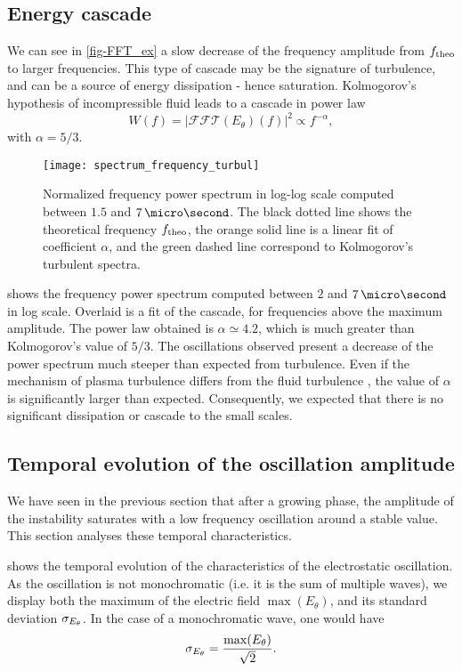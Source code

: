   \subsection{Energy cascade} \label{subsec-turbul}
  
  We can see in \cref{fig-FFT_ex} a slow decrease of the frequency amplitude from $f_{\rm theo}$ to larger frequencies.
  This type of cascade may be the signature of turbulence, and can be a source of energy dissipation - hence saturation.
  Kolmogorov's hypothesis of incompressible fluid leads to a cascade in power law \[ W(f) = | \mathcal{FFT}(E_{\theta})(f) |^2 \propto f ^ {- \alpha}, \]
  with $\alpha = 5/3$.
  \begin{figure}[!hbt]
    \centering
    \texttt{[image: spectrum\_frequency\_turbul]}
    \caption{Normalized frequency power spectrum in log-log scale computed between $1.5$ and $7\,\micro\second$. The black dotted line shows the  theoretical frequency $f_{\rm theo}$, the orange solid line is a linear fit of coefficient $\alpha$, and the green dashed line correspond to Kolmogorov's turbulent spectra. }
    \label{fig-turbul}
  \end{figure}
  
   shows the frequency power spectrum computed between $2$ and $7\,\micro\second$ in log scale.
  Overlaid is a fit of the cascade, for frequencies above the maximum amplitude.
  The power law obtained is $\alpha \simeq 4.2$, which is much greater than Kolmogorov's value of $5/3$.
  The oscillations observed present a decrease of the power spectrum much steeper than expected from turbulence.
  Even if the mechanism of plasma turbulence differs from the fluid turbulence \citep{tsytovich1972}, the value of $\alpha$ is significantly larger than expected.
  Consequently, we expected that there is no significant dissipation or cascade to the small scales.
  
  \subsection{Temporal evolution of the oscillation amplitude} \label{subsec-temp}
  We have seen in the previous section that after a growing phase, the amplitude of the instability saturates with a low frequency oscillation around a stable value.
  This section analyses these temporal characteristics.
  
   shows the temporal evolution of the characteristics of the electrostatic oscillation.
  As the oscillation is not monochromatic (i.e. it is the sum of multiple waves), we display both the maximum of the electric field $\max(E_{\theta})$, and its standard deviation $\sigma_{E_{\theta}}$.
  In the case of a monochromatic wave, one would have 
  \[ \sigma_{E_{\theta}} = \frac{\max(E_{\theta})}{\sqrt{2}}.  \]
  
